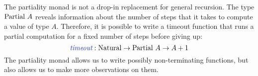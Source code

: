 The partiality monad is not a drop-in replacement for general
recursion. The type $\textrm{Partial}~A$ reveals information about the
number of steps that it takes to compute a value of type
$A$. Therefore, it is possible to write a timeout function that runs a
partial computation for a fixed number of steps before giving up:
\begin{displaymath}
  \defn{timeout} : \tyname{Natural} \to \tyname{Partial}~A \to A + 1
\end{displaymath}
The partiality monad allows us to write possibly non-terminating
functions, but also allows us to make more observations on them.

